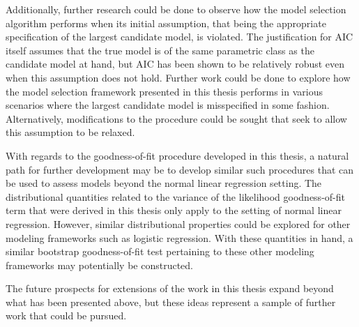 		Additionally, further research could be done to observe how the model selection algorithm performs when its initial assumption, that being the appropriate
		specification of the largest candidate model, is violated. The justification for AIC itself assumes that the true model is of the same parametric class as the candidate model
		at hand, but AIC has been shown to be relatively robust even when this assumption does not hold. Further work could be done to explore how the model selection
		framework presented in this thesis performs in various scenarios where the largest candidate model is misspecified in some fashion. Alternatively, modifications
		to the procedure could be sought that seek to allow this assumption to be relaxed.

		With regards to the goodness-of-fit procedure developed in this thesis, a natural path for further development may be to develop similar such procedures that can
		be used to assess models beyond the normal linear regression setting. The distributional quantities related to the variance of the likelihood goodness-of-fit term that were derived
		in this thesis only apply to the setting of normal linear regression. However, similar distributional properties could be explored for other modeling frameworks such
		as logistic regression. With these quantities in hand, a similar bootstrap goodness-of-fit test pertaining to these other modeling frameworks may potentially be constructed.
		
		The future prospects for extensions of the work in this thesis expand beyond what has been presented above, but these ideas represent a sample of further work that
		could be pursued.
		
		
		